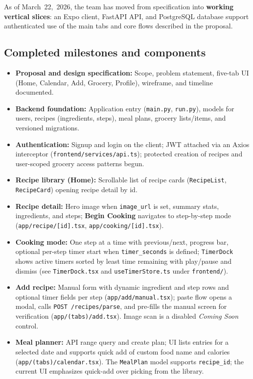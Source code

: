 As of March~22,~2026, the team has moved from specification into \textbf{working vertical slices}: an Expo client, FastAPI API, and PostgreSQL database support authenticated use of the main tabs and core flows described in the proposal.

\subsection{Completed milestones and components}
\begin{itemize}[leftmargin=*]
  \item \textbf{Proposal and design specification:} Scope, problem statement, five-tab UI (Home, Calendar, Add, Grocery, Profile), wireframe, and timeline documented.
  \item \textbf{Backend foundation:} Application entry (\texttt{main.py}, \texttt{run.py}), models for users, recipes (ingredients, steps), meal plans, grocery lists/items, and versioned migrations.
  \item \textbf{Authentication:} Signup and login on the client; JWT attached via an Axios interceptor (\texttt{frontend/services/api.ts}); protected creation of recipes and user-scoped grocery access patterns begun.
  \item \textbf{Recipe library (Home):} Scrollable list of recipe cards (\texttt{RecipeList}, \texttt{RecipeCard}) opening recipe detail by id.
  \item \textbf{Recipe detail:} Hero image when \texttt{image\_url} is set, summary stats, ingredients, and steps; \textbf{Begin Cooking} navigates to step-by-step mode (\texttt{app/recipe/[id].tsx}, \texttt{app/cooking/[id].tsx}).
  \item \textbf{Cooking mode:} One step at a time with previous/next, progress bar, optional per-step timer start when \texttt{timer\_seconds} is defined; \texttt{TimerDock} shows active timers sorted by least time remaining with play/pause and dismiss (see \texttt{TimerDock.tsx} and \texttt{useTimerStore.ts} under \texttt{frontend/}).
  \item \textbf{Add recipe:} Manual form with dynamic ingredient and step rows and optional timer fields per step (\texttt{app/add/manual.tsx}); paste flow opens a modal, calls \texttt{POST /recipes/parse}, and pre-fills the manual screen for verification (\texttt{app/(tabs)/add.tsx}). Image scan is a disabled \emph{Coming Soon} control.
  \item \textbf{Meal planner:} API range query and create plan; UI lists entries for a selected date and supports quick add of custom food name and calories (\texttt{app/(tabs)/calendar.tsx}). The \texttt{MealPlan} model supports \texttt{recipe\_id}; the current UI emphasizes quick-add over picking from the library.

\end{itemize}
